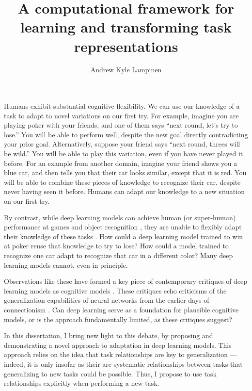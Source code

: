 \documentclass[12pt]{article}
\title{A computational framework for learning and transforming task representations}
\author{Andrew Kyle Lampinen}
\date{}
\begin{document}
\maketitle

Humans exhibit substantial cognitive flexibility. We can use our knowledge of a task to adapt to novel variations on our first try. For example, imagine you are playing poker with your friends, and one of them says ``next round, let's try to lose.'' You will be able to perform well, despite the new goal directly contradicting your prior goal. Alternatively, suppose your friend says ``next round, threes will be wild.'' You will be able to play this variation, even if you have never played it before. For an example from another domain, imagine your friend shows you a blue car, and then tells you that their car looks similar, except that it is red. You will be able to combine these pieces of knowledge to recognize their car, despite never having seen it before. Humans can adapt our knowledge to a new situation on our first try. 

By contrast, while deep learning models can achieve human (or super-human) performance at games \citep{Silver2017,Vinyals2019} and object recognition \citep{Szegedy2016}, they are unable to flexibly adapt their knowledge of these tasks \citep{Lake2016}. How could a deep learning model trained to win at poker reuse that knowledge to try to lose? How could a model trained to recognize one car adapt to recognize that car in a different color? Many deep learning models cannot, even in principle.  

Observations like these have formed a key piece of contemporary critiques of deep learning models as cognitive models \citep{Lake2016,Marcus2018}. These critiques echo criticisms of the generalization capabilities of neural networks from the earlier days of connectionism \citep{Fodor1988}. Can deep learning serve as a foundation for plausible cognitive models, or is the approach fundamentally limited, as these critiques suggest? 

In this dissertation, I bring new light to this debate, by proposing and demonstrating a novel approach to adaptation in deep learning models. This approach relies on the idea that task relationships are key to generalization --- indeed, it is only insofar as their are systematic relationships between tasks that generalizing to new tasks could be possible. Thus, I propose to use task relationships explicitly when performing a new task.
\end{document}
